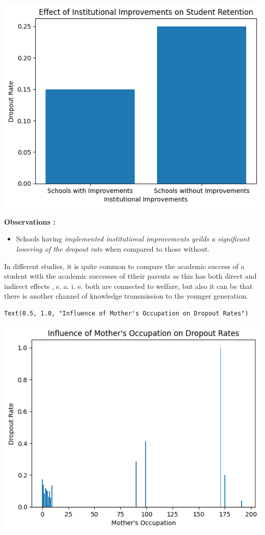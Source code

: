 \documentclass[
  letterpaper,
  DIV=11,
  numbers=noendperiod]{scrartcl}
\providecommand{\tightlist}{%
  \setlength{\itemsep}{0pt}\setlength{\parskip}{0pt}}\usepackage{longtable,booktabs,array}
\begin{document}
\includegraphics{report_AzadhdhinNedalYunisAlFraijat_files/figure-pdf/cell-22-output-2.png}

\textbf{Observations :}

\begin{itemize}
\tightlist
\item
  Schools having \emph{implemented institutional improvements yeilds a
  significant lowering of the dropout rate} when compared to those
  without.
\end{itemize}

In different studies, it is quite common to compare the academic success
of a student with the academic successes of ttheir parents as this has
both direct and indirect effects , s. a. i. e. both are connected to
welfare, but also it can be that there is another channel of knowledge
transmission to the younger generation.

\begin{verbatim}
Text(0.5, 1.0, "Influence of Mother's Occupation on Dropout Rates")
\end{verbatim}

\includegraphics{report_AzadhdhinNedalYunisAlFraijat_files/figure-pdf/cell-23-output-2.png}
\end{document}
